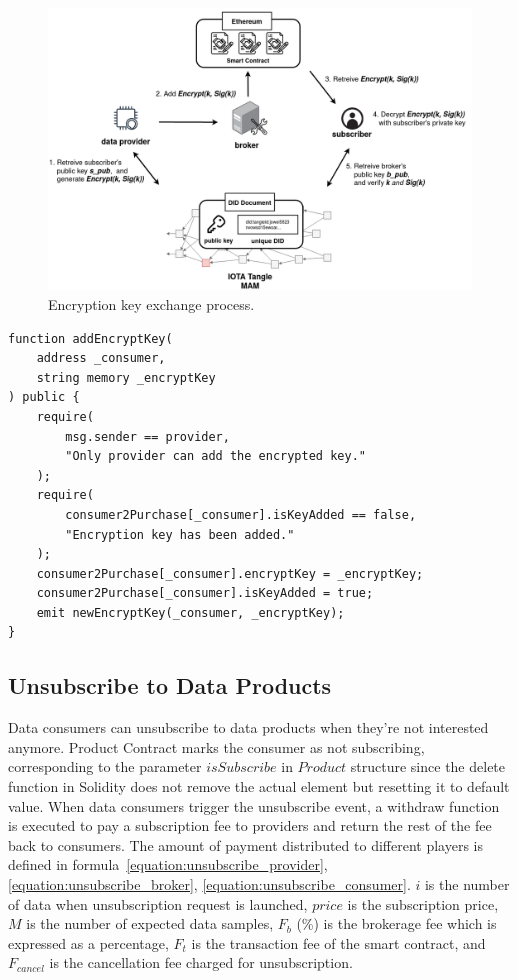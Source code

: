 \begin{spacing}{2.0}
\begin{figure}[H]
    \centering
    \includegraphics[width=5.5in]{img/key_exchange}
    \caption{Encryption key exchange process.}
    \label{fig:key_exchange}
\end{figure}
\clearpage

\lstset{style=solidity}
\begin{lstlisting}[caption={Add encryption key to data consumers}, label={lst:key_exchange}, frame=single]
function addEncryptKey(
    address _consumer,
    string memory _encryptKey
) public {
    require(
        msg.sender == provider,
        "Only provider can add the encrypted key."
    );
    require(
        consumer2Purchase[_consumer].isKeyAdded == false,
        "Encryption key has been added."
    );
    consumer2Purchase[_consumer].encryptKey = _encryptKey;
    consumer2Purchase[_consumer].isKeyAdded = true;
    emit newEncryptKey(_consumer, _encryptKey);
}
\end{lstlisting}

\subsection{Unsubscribe to Data Products}
Data consumers can unsubscribe to data products when they're not interested anymore. Product Contract marks the consumer as not subscribing, corresponding to the parameter $isSubscribe$ in $Product$ structure since the delete function in Solidity does not remove the actual element but resetting it to default value. When data consumers trigger the unsubscribe event, a withdraw function is executed to pay a subscription fee to providers and return the rest of the fee back to consumers. The amount of payment distributed to different players is defined in formula~\ref{equation:unsubscribe_provider}, \ref{equation:unsubscribe_broker}, \ref{equation:unsubscribe_consumer}. $i$ is the number of data when unsubscription request is launched, $price$  is the subscription price, $M$ is the number of expected data samples, $F_{b}$ (\%) is the brokerage fee which is expressed as a percentage, $F_{t}$ is the transaction fee of the smart contract, and $F_{cancel}$ is the cancellation fee charged for unsubscription.


\end{spacing}

